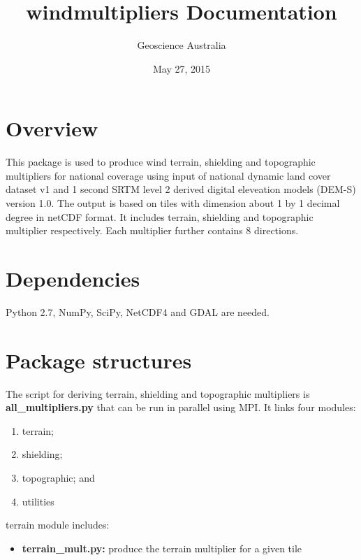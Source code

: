 \documentclass[letterpaper,10pt,english]{sphinxmanual}
\title{windmultipliers Documentation}
\date{May 27, 2015}
\author{Geoscience Australia}
\begin{document}
\maketitle
\tableofcontents
{}\label{index::doc}



\chapter{Overview}
\label{index:wind-multipliers}\label{index:overview}
This package is used to produce wind terrain, shielding and topographic multipliers for national coverage using input of national dynamic land cover dataset v1 and 1 second SRTM level 2 derived digital eleveation models (DEM-S) version 1.0. The output is based on tiles with dimension about 1 by 1 decimal degree in netCDF format. It includes terrain, shielding and topographic multiplier respectively. Each multiplier further contains 8 directions.


\chapter{Dependencies}
\label{index:dependencies}
Python 2.7, NumPy, SciPy, NetCDF4 and GDAL are needed.


\chapter{Package structures}
\label{index:package-structures}
The script for deriving terrain, shielding and topographic multipliers is
\textbf{all\_multipliers.py} that can be run in parallel using MPI. It links four modules:
\begin{enumerate}
\item {} 
terrain;

\item {} 
shielding;

\item {} 
topographic; and

\item {} 
utilities

\end{enumerate}

terrain module includes:
\begin{itemize}
\item {} 
\textbf{terrain\_mult.py:} produce the terrain multiplier for a given tile

\end{itemize}
\end{document}
